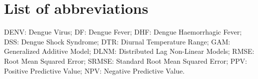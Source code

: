 \documentclass{bmcart}
\begin{document}
\section*{List of abbreviations}
DENV: Dengue Virus; DF: Dengue Fever; DHF: Dengue Haemorrhagic Fever; DSS: Dengue Shock Syndrome; DTR: Diurnal Temperature Range; GAM: Generalized Additive Model; DLNM: Distributed Lag Non-Linear Models; RMSE: Root Mean Squared Error; SRMSE: Standard Root Mean Squared Error; PPV: Positive Predictive Value; NPV: Negative Predictive Value. 





\clearpage %




\end{document}
